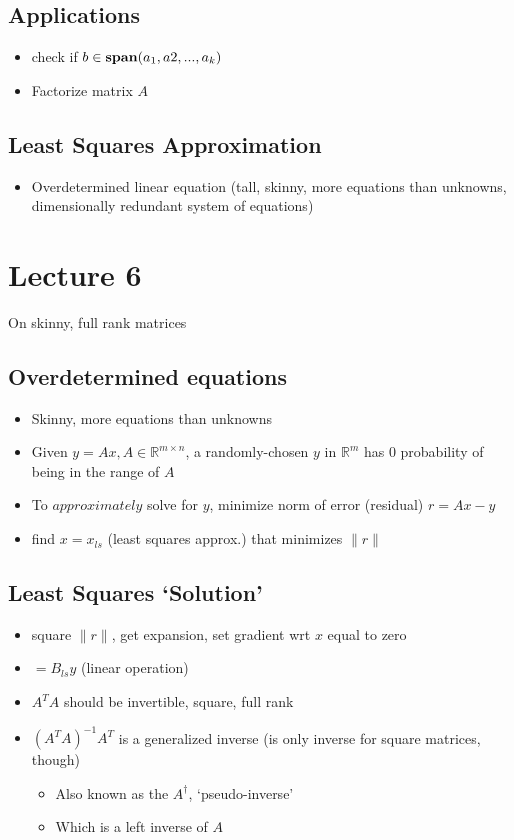 \documentclass[10pt,letterpaper]{article}
\begin{document}
\subsection{Applications}
\label{sec-3_7}

\begin{itemize}
\item check if $b \in {\bf span} (a_1, a2, ..., a_k)$
\item Factorize matrix $A$
\end{itemize}
\subsection{Least Squares Approximation}
\label{sec-3_8}

\begin{itemize}
\item Overdetermined linear equation (tall, skinny, more equations than unknowns, dimensionally redundant system of equations)
\end{itemize}
\section{Lecture 6}
\label{sec-4}

On skinny, full rank matrices
\subsection{Overdetermined equations}
\label{sec-4_1}

\begin{itemize}
\item Skinny, more equations than unknowns
\item Given $y=Ax, A\in \mathbb{R}^{m\times n}$, a randomly-chosen $y$ in $\mathbb{R}^{m}$ has 0 probability of being in the range of $A$
\item To $approximately$ solve for $y$, minimize norm of error (residual) $r=Ax-y$
\item find $x=x _{ls}$ (least squares approx.) that minimizes $\|r\|$
\end{itemize}
\subsection{Least Squares `Solution'}
\label{sec-4_2}

\begin{itemize}
\item square $\|r\|$, get expansion, set gradient wrt $x$ equal to zero
\item {} $=B_{ls} y$ (linear operation)
\item $A ^{T} A$ should be invertible, square, full rank
\item $(A ^{T} A)^{-1} A ^{T}$ is a generalized inverse (is only inverse for square matrices, though)

\begin{itemize}
\item Also known as the $A^\dagger$, `pseudo-inverse'
\item Which is a left inverse of $A$
\end{itemize}

\end{itemize}
\end{document}
